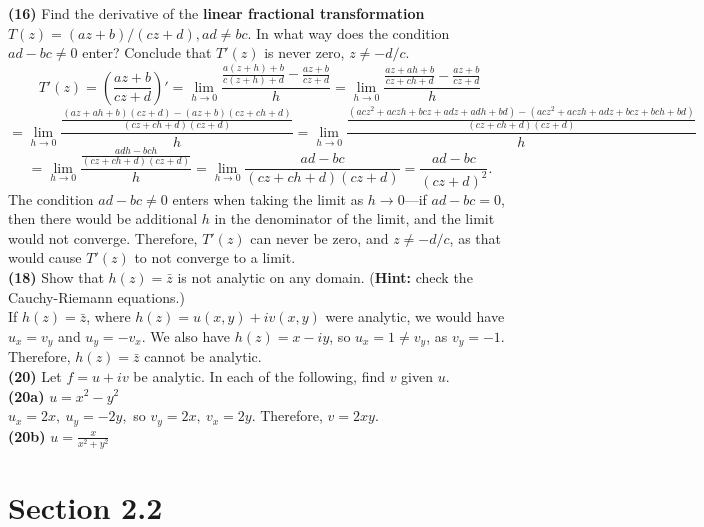 \documentclass[12pt,letterpaper]{article}
\begin{document}
\textbf{(16)} Find the derivative of the \textbf{linear fractional transformation} \(T(z) = (az+b)/(cz+d), ad \neq bc.\) In what way does the condition \(ad - bc \neq 0\) enter? Conclude that \(T'(z)\) is never zero, \(z \neq -d/c\). \\

\[T'(z) = \left( \frac{az+b}{cz+d} \right)' = \lim_{h \to 0} \frac{\frac{a(z+h) + b}{c(z+h) + d} - \frac{az+b}{cz+d}}{h} = \lim_{h \to 0} \frac{\frac{az+ah + b}{cz+ch + d} - \frac{az+b}{cz+d}}{h}\] \[= \lim_{h \to 0} \frac{\frac{(az+ah + b)(cz+d)-(az+b)(cz+ch+d)}{(cz+ch + d)(cz+d)}}{h} = \lim_{h \to 0} \frac{\frac{(acz^{2}+aczh + bcz + adz + adh + bd )-(acz^{2} + aczh + adz + bcz + bch + bd )}{(cz+ch + d)(cz+d)}}{h}\] \[= \lim_{h \to 0} \frac{\frac{adh-bch}{(cz+ch + d)(cz+d)}}{h} = \lim_{h \to 0} \frac{ad - bc}{(cz + ch + d)(cz+d)} = \frac{ad-bc}{(cz+d)^{2}}.\] The condition \(ad-bc \neq 0\) enters when taking the limit as \(h \to 0\)---if \(ad-bc = 0\), then there would be additional \(h\) in the denominator of the limit, and the limit would not converge. Therefore, \(T'(z)\) can never be zero, and \(z \neq -d/c\), as that would cause \(T'(z)\) to not converge to a limit. \\

\textbf{(18)} Show that \(h(z) = \bar{z}\) is not analytic on any domain. (\textbf{Hint:} check the Cauchy-Riemann equations.) \\

If \(h(z) = \bar{z}\), where \(h(z) = u(x,y) + iv(x,y)\) were analytic, we would have \(u_{x} = v_{y}\) and \(u_{y} = -v_{x}\). We also have \(h(z) = x - iy\), so \(u_{x} = 1 \neq v_{y}\), as \(v_{y} = -1\). Therefore, \(h(z) = \bar{z}\) cannot be analytic. \\

\textbf{(20)} Let \(f = u + iv\) be analytic. In each of the following, find \(v\) given \(u\). \\

\textbf{(20a)} \(u = x^{2} - y^{2}\) \\

\(u_{x} = 2x,\ u_{y} = -2y,\) so \(v_{y} = 2x,\ v_{x} = 2y\). Therefore, \(v = 2xy\). \\

\textbf{(20b)} \(u = \frac{x}{x^{2} + y^{2}}\) \\
	

	
\section*{Section 2.2} 
\end{document}
